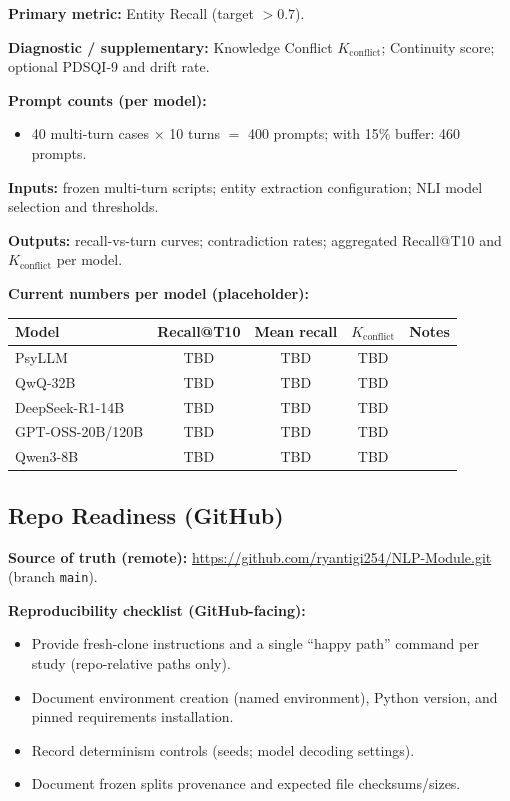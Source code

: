 \documentclass[11pt,a4paper]{article}
\begin{document}
\textbf{Primary metric:} Entity Recall (target \(>0.7\)).

\textbf{Diagnostic / supplementary:} Knowledge Conflict \(K_{\text{conflict}}\); Continuity score; optional PDSQI-9 and drift rate.

\textbf{Prompt counts (per model):}
\begin{itemize}
  \item 40 multi-turn cases \(\times\) 10 turns \(=\) 400 prompts; with 15\% buffer: 460 prompts.
\end{itemize}

\textbf{Inputs:} frozen multi-turn scripts; entity extraction configuration; NLI model selection and thresholds.

\textbf{Outputs:} recall-vs-turn curves; contradiction rates; aggregated Recall@T10 and \(K_{\text{conflict}}\) per model.

\textbf{Current numbers per model (placeholder):}
\begin{center}
\begin{tabular}{lcccc}
\hline
\textbf{Model} & \textbf{Recall@T10} & \textbf{Mean recall} & \(K_{\text{conflict}}\) & \textbf{Notes} \\
\hline
PsyLLM & TBD & TBD & TBD & \\
QwQ-32B & TBD & TBD & TBD & \\
DeepSeek-R1-14B & TBD & TBD & TBD & \\
GPT-OSS-20B/120B & TBD & TBD & TBD & \\
Qwen3-8B & TBD & TBD & TBD & \\
\hline
\end{tabular}
\end{center}

\subsection*{Repo Readiness (GitHub)}
\textbf{Source of truth (remote):} \url{https://github.com/ryantigi254/NLP-Module.git} (branch \texttt{main}).

\textbf{Reproducibility checklist (GitHub-facing):}
\begin{itemize}
  \item Provide fresh-clone instructions and a single ``happy path'' command per study (repo-relative paths only).
  \item Document environment creation (named environment), Python version, and pinned requirements installation.
  \item Record determinism controls (seeds; model decoding settings).
  \item Document frozen splits provenance and expected file checksums/sizes.
\end{itemize}
\end{document}
